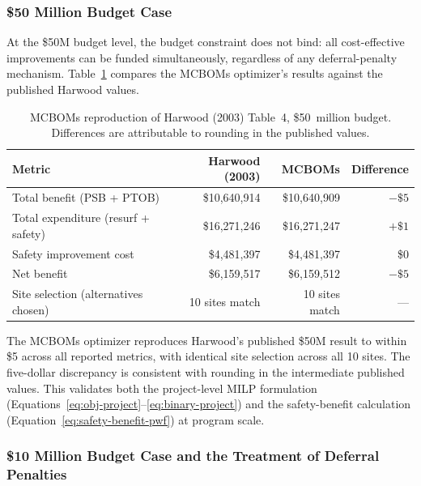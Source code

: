 \subsubsection{\$50 Million Budget Case}
\label{sec:validation-harwood-50m}

At the \$50M budget level, the budget constraint does not bind: all
cost-effective improvements can be funded simultaneously, regardless of any
deferral-penalty mechanism. Table~\ref{tab:harwood-50m} compares the MCBOMs
optimizer's results against the published Harwood values.

\begin{table}[H]
\centering
\caption{MCBOMs reproduction of Harwood (2003) Table~4, \$50~million budget.
Differences are attributable to rounding in the published values.}
\label{tab:harwood-50m}
\begin{tabular}{lrrr}
\toprule
\textbf{Metric} & \textbf{Harwood (2003)} & \textbf{MCBOMs} & \textbf{Difference} \\
\midrule
Total benefit (PSB + PTOB)             & \$10{,}640{,}914 & \$10{,}640{,}909 & $-\$5$ \\
Total expenditure (resurf + safety)    & \$16{,}271{,}246 & \$16{,}271{,}247 & $+\$1$ \\
Safety improvement cost                & \$4{,}481{,}397  & \$4{,}481{,}397  & \$0    \\
Net benefit                            & \$6{,}159{,}517  & \$6{,}159{,}512  & $-\$5$ \\
\midrule
Site selection (alternatives chosen)   & 10 sites match   & 10 sites match   & ---    \\
\bottomrule
\end{tabular}
\end{table}

The MCBOMs optimizer reproduces Harwood's published \$50M result to within
\$5 across all reported metrics, with identical site selection across all 10
sites. The five-dollar discrepancy is consistent with rounding in the
intermediate published values. This validates both the project-level MILP
formulation (Equations~\ref{eq:obj-project}--\ref{eq:binary-project}) and the
safety-benefit calculation (Equation~\ref{eq:safety-benefit-pwf}) at program
scale.

\subsubsection{\$10 Million Budget Case and the Treatment of Deferral
Penalties}
\label{sec:validation-harwood-10m}

